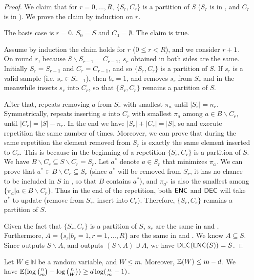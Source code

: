 \begin{proof}
  We claim that for $r=0,\ldots, R$, $\{S_r, C_r\}$ is a partition of $S$ ($S_r$ is in \enc, and $C_r$ is in \dec). We prove the claim by induction on $r$.
  
  The basis case is $r=0$. $S_0=S$ and $C_0=\emptyset$. The claim is true.
  
  Assume by induction the claim holds for $r$ ($0\le r < R$), and we consider $r+1$. 
  On round $r$, because $S\backslash S_{r-1}=C_{r-1}$, $s_r$ obtained in both sides are the same. 
  Initially $S_r=S_{r-1}$ and $C_r=C_{r-1}$, and so $\{S_r,C_r\}$ is a partition of $S$. 
  If $s_r$ is a valid sample (i.e. $s_r\in S_{r-1}$), then $b_r=1$, and \enc removes $s_r$ from $S_r$ and in the meanwhile \dec inserts $s_r$ into $C_r$, so that $\{S_r, C_r\}$ remains a partition of $S$. 
  
  After that, \enc repeats removing $a$ from $S_r$ with smallest $\pi_a$ until $|S_r|=n_r$. 
  Symmetrically, \dec repeats inserting $a$ into $C_r$ with smallest $\pi_a$ among $a\in B\backslash C_r$, until $|C_r|=|S|-n_r$. 
  In the end we have $|S_r|+|C_r|=|S|$, so \enc and \dec execute repetition the same number of times. 
  Moreover, we can prove that during the same repetition the element removed from $S_r$ is exactly the same element inserted to $C_r$. 
  This is because in the beginning of a repetition $\{S_r, C_r\}$ is a partition of $S$. 
  We have $B\backslash C_r\subseteq S\backslash C_r=S_r$. Let $a^*$ denote  $a\in S_r$ that minimizes $\pi_a$. 
  We can prove that $a^*\in B\backslash C_r\subseteq S_r$ (since $a^*$ will be removed from $S_r$, it has no chance to be included in $S$ in \enc, so that $B$ contains $a^*$), and $\pi_{a^*}$ is also the smallest among $\{\pi_a|a\in B\backslash C_r\}$. 
  Thus in the end of the repetition, both $\textsf{ENC}$ and $\textsf{DEC}$ will take $a^{*}$ to update (remove from $S_r$, insert into $C_r$). 
  Therefore, $\{S_r, C_r\}$ remains a partition of $S$.
  
  Given the fact that $\{S_r, C_r\}$ is a partition of $S$, $s_r$ are the same in \enc and \dec. 
  Furthermore, $A=\{s_r|b_r=1,r=1,\ldots, R\}$ are the same in \enc and \dec.
  We know $A\subseteq S$. 
  Since \enc outputs $S\backslash A$, and \dec outputs $(S\backslash A)\cup A$, we have $\textsf{DEC}(\textsf{ENC}(S))=S$. 
\end{proof}

\begin{lemma} \label{lemma:bits-saving}
  Let $W\in \mathbb{N}$ be a random variable, and $W\le m$. 
  Moreover, $\operatorname*{\mathbb{E}}(W)\le m-d$. 
  We have $\operatorname*{\mathbb{E}}(\log {n \choose m}-\log {n \choose W})\ge d \log (\frac{n}{m}-1)$.
\end{lemma}

